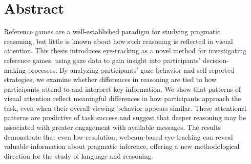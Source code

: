 ﻿\section*{Abstract}
Reference games are a well-established paradigm for studying pragmatic reasoning, but little is known about how such reasoning is reflected in visual attention. This thesis introduces eye-tracking as a novel method for investigating reference games, using gaze data to gain insight into participants' decision-making processes. By analyzing participants' gaze behavior and self-reported strategies, we examine whether differences in reasoning are tied to how participants attend to and interpret key information. We show that patterns of visual attention reflect meaningful differences in how participants approach the task, even when their overall viewing behavior appears similar. These attentional patterns are predictive of task success and suggest that deeper reasoning may be associated with greater engagement with available messages. The results demonstrate that even low-resolution, webcam-based eye-tracking can reveal valuable information about pragmatic inference, offering a new methodological direction for the study of language and reasoning.